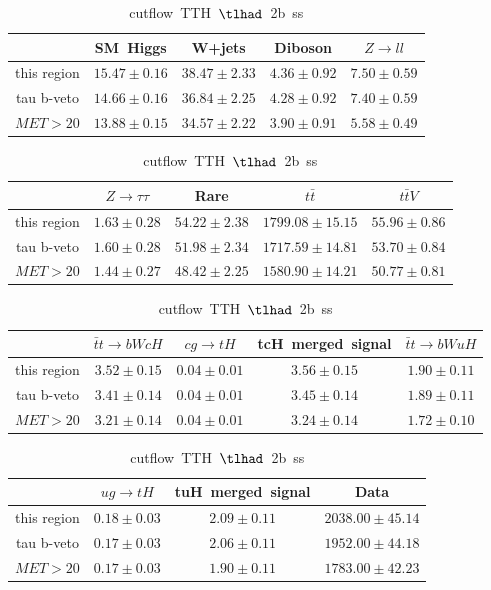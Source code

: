 \begin{table}
\footnotesize
\caption{cutflow~TTH~$\tlhad$~2b~ss}
\centering
\begin{tabular}{|c|c|c|c|c|} \hline
 & SM~Higgs & W+jets & Diboson & $Z\to ll$\\\hline
this region & $15.47\pm0.16$ & $38.47\pm2.33$ & $4.36\pm0.92$ & $7.50\pm0.59$\\\hline
tau b-veto & $14.66\pm0.16$ & $36.84\pm2.25$ & $4.28\pm0.92$ & $7.40\pm0.59$\\\hline
$MET>20$ & $13.88\pm0.15$ & $34.57\pm2.22$ & $3.90\pm0.91$ & $5.58\pm0.49$\\\hline
\end{tabular}
\begin{tabular}{|c|c|c|c|c|} \hline
 & $Z\to \tau\tau$ & Rare & $t\bar{t}$ & $t\bar{t}V$\\\hline
this region & $1.63\pm0.28$ & $54.22\pm2.38$ & $1799.08\pm15.15$ & $55.96\pm0.86$\\\hline
tau b-veto & $1.60\pm0.28$ & $51.98\pm2.34$ & $1717.59\pm14.81$ & $53.70\pm0.84$\\\hline
$MET>20$ & $1.44\pm0.27$ & $48.42\pm2.25$ & $1580.90\pm14.21$ & $50.77\pm0.81$\\\hline
\end{tabular}
\begin{tabular}{|c|c|c|c|c|} \hline
 & $\bar{t}t\to bWcH$ & $cg\to tH$ & tcH~merged~signal & $\bar{t}t\to bWuH$\\\hline
this region & $3.52\pm0.15$ & $0.04\pm0.01$ & $3.56\pm0.15$ & $1.90\pm0.11$\\\hline
tau b-veto & $3.41\pm0.14$ & $0.04\pm0.01$ & $3.45\pm0.14$ & $1.89\pm0.11$\\\hline
$MET>20$ & $3.21\pm0.14$ & $0.04\pm0.01$ & $3.24\pm0.14$ & $1.72\pm0.10$\\\hline
\end{tabular}
\begin{tabular}{|c|c|c|c|} \hline
 & $ug\to tH$ & tuH~merged~signal & Data\\\hline
this region & $0.18\pm0.03$ & $2.09\pm0.11$ & $2038.00\pm45.14$\\\hline
tau b-veto & $0.17\pm0.03$ & $2.06\pm0.11$ & $1952.00\pm44.18$\\\hline
$MET>20$ & $0.17\pm0.03$ & $1.90\pm0.11$ & $1783.00\pm42.23$\\\hline
\end{tabular}
\label{tab:cutflow_reg1l1tau2b3j_ss}
\end{table}

